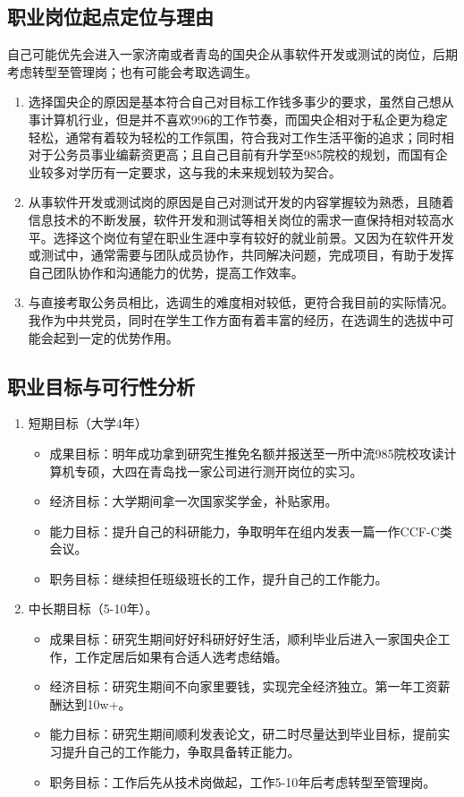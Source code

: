\documentclass{article}
\begin{document}
\subsection{职业岗位起点定位与理由}
自己可能优先会进入一家济南或者青岛的国央企从事软件开发或测试的岗位，后期考虑转型至管理岗；也有可能会考取选调生。\par
\begin{enumerate}
	\item 选择国央企的原因是基本符合自己对目标工作钱多事少的要求，虽然自己想从事计算机行业，但是并不喜欢996的工作节奏，而国央企相对于私企更为稳定轻松，通常有着较为轻松的工作氛围，符合我对工作生活平衡的追求；同时相对于公务员事业编薪资更高；且自己目前有升学至985院校的规划，而国有企业较多对学历有一定要求，这与我的未来规划较为契合。
	\item 从事软件开发或测试岗的原因是自己对测试开发的内容掌握较为熟悉，且随着信息技术的不断发展，软件开发和测试等相关岗位的需求一直保持相对较高水平。选择这个岗位有望在职业生涯中享有较好的就业前景。又因为在软件开发或测试中，通常需要与团队成员协作，共同解决问题，完成项目，有助于发挥自己团队协作和沟通能力的优势，提高工作效率。
	\item 与直接考取公务员相比，选调生的难度相对较低，更符合我目前的实际情况。我作为中共党员，同时在学生工作方面有着丰富的经历，在选调生的选拔中可能会起到一定的优势作用。
\end{enumerate}
\subsection{职业目标与可行性分析}
\par
\begin{enumerate}[(1)]
	\item 短期目标（大学4年）
	\begin{itemize}
		\item 成果目标：明年成功拿到研究生推免名额并报送至一所中流985院校攻读计算机专硕，大四在青岛找一家公司进行测开岗位的实习。
		\item 经济目标：大学期间拿一次国家奖学金，补贴家用。
		\item 能力目标：提升自己的科研能力，争取明年在组内发表一篇一作CCF-C类会议。
		\item 职务目标：继续担任班级班长的工作，提升自己的工作能力。
	\end{itemize}
	\item 中长期目标（5-10年）。
	\begin{itemize}
		\item 成果目标：研究生期间好好科研好好生活，顺利毕业后进入一家国央企工作，工作定居后如果有合适人选考虑结婚。
		\item 经济目标：研究生期间不向家里要钱，实现完全经济独立。第一年工资薪酬达到10w+。
		\item 能力目标：研究生期间顺利发表论文，研二时尽量达到毕业目标，提前实习提升自己的工作能力，争取具备转正能力。
		\item 职务目标：工作后先从技术岗做起，工作5-10年后考虑转型至管理岗。
	\end{itemize}
\end{enumerate}
\end{document}
